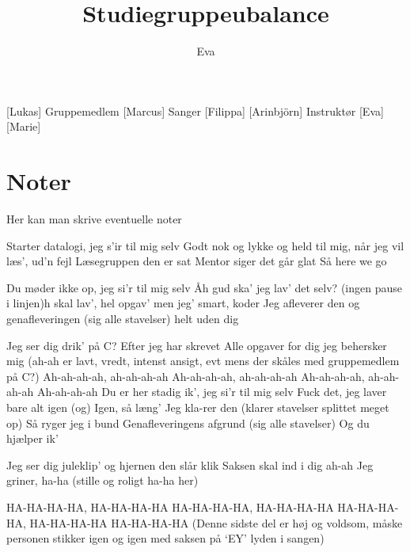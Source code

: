 \documentclass[a4paper,11pt]{article}
\title{Studiegruppeubalance}
\author{Eva}
\begin{document}
\maketitle

\begin{roles}
[Lukas] Gruppemedlem
[Marcus] Sanger
[Filippa]
[Arinbjörn] Instruktør
[Eva]
[Marie]

\end{roles} 

\section*{Noter}
Her kan man skrive eventuelle noter 

\begin{props}
\prop{}
\prop{}
\prop{}
\prop{}
\prop{}
\prop{}
\end{props}



\begin{song}
 Starter datalogi, jeg s’ir til mig selv
Godt nok og lykke og held
til mig, når jeg
vil læs’, ud’n fejl
Læsegruppen den er sat 
Mentor siger det går glat
Så here we go

Du møder ikke op, jeg si’r til mig selv
Åh gud ska’ jeg lav’ det selv? (ingen pause i linjen)h
skal lav’, hel opgav’
men jeg’ smart, koder
Jeg afleverer den
og genafleveringen (sig alle stavelser)
helt uden dig

Jeg ser dig drik’ på C?
Efter jeg har skrevet
Alle opgaver for dig
jeg behersker mig
(ah-ah er lavt, vredt, intenst ansigt, evt mens der skåles med gruppemedlem på C?)
Ah-ah-ah-ah, ah-ah-ah-ah
Ah-ah-ah-ah, ah-ah-ah-ah
Ah-ah-ah-ah, ah-ah-ah-ah
Ah-ah-ah-ah
Du er her stadig ik’, jeg si’r til mig selv
Fuck det, jeg laver bare alt igen
(og) Igen, så læng’
Jeg kla-rer den (klarer stavelser splittet meget op)
Så ryger jeg i bund
Genafleveringens afgrund (sig alle stavelser)
Og du hjælper ik’

Jeg ser dig juleklip’
og hjernen den slår klik
Saksen skal ind i dig ah-ah
Jeg griner, ha-ha (stille og roligt ha-ha her)

HA-HA-HA-HA, HA-HA-HA-HA 
HA-HA-HA-HA, HA-HA-HA-HA
HA-HA-HA-HA, HA-HA-HA-HA
HA-HA-HA-HA
(Denne sidste del er høj og voldsom, måske personen stikker igen og igen med saksen på ‘EY’ lyden i sangen) 

\end{song}
\end{document}
